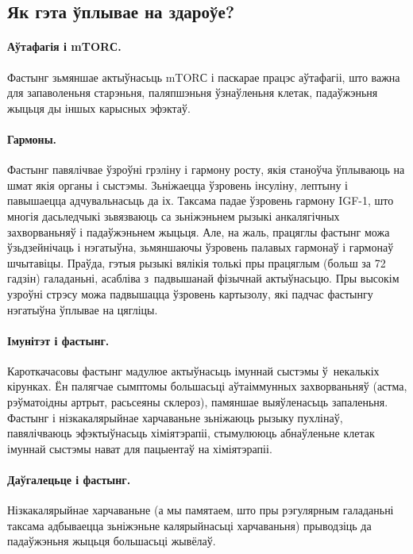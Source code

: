 \subsection{Як гэта ўплывае на здароўе?}

\paragraph{Аўтафагія і mTORС.}
Фастынг зьмяншае актыўнасьць mTORС і паскарае працэс аўтафагіі, што важна для запаволеньня старэньня, паляпшэньня ўзнаўленьня клетак, падаўжэньня жыцьця ды іншых карысных эфэктаў.

\paragraph{Гармоны.}
Фастынг павялічвае ўзроўні грэліну і гармону росту, якія станоўча ўплываюць на шмат якія органы і сыстэмы. Зьніжаецца ўзровень інсуліну, лептыну і павышаецца адчувальнасьць да іх. Таксама падае ўзровень гармону IGF-1, што многія дасьледчыкі зьвязваюць са зьніжэньнем рызыкі анкалягічных захворваньняў і падаўжэньнем жыцьця. Але, на жаль, працяглы фастынг можа ўзьдзейнічаць і нэгатыўна, зьмяншаючы ўзровень палавых гармонаў і гармонаў шчытавіцы. Праўда, гэтыя рызыкі вялікія толькі пры працяглым (больш за 72 гадзін) галаданьні, асабліва з~падвышанай фізычнай актыўнасьцю. Пры высокім узроўні стрэсу можа падвышацца ўзровень картызолу, які падчас фастынгу нэгатыўна ўплывае на цягліцы.

\paragraph{Імунітэт і фастынг.}
Кароткачасовы фастынг мадулюе актыўнасьць імуннай сыстэмы ў~некалькіх кірунках. Ён палягчае сымптомы большасьці аўтаіммунных захворваньняў (астма, рэўматоідны артрыт, расьсеяны склероз), памяншае выяўленасьць запаленьня. Фастынг і нізкакалярыйнае харчаваньне зьніжаюць рызыку пухлінаў, павялічваюць эфэктыўнасьць хіміятэрапіі, стымулююць абнаўленьне клетак імуннай сыстэмы нават для пацыентаў на хіміятэрапіі.

\paragraph{Даўгалецьце і фастынг.}
Нізкакалярыйнае харчаваньне (а мы памятаем, што пры рэгулярным галаданьні таксама адбываецца зьніжэньне калярыйнасьці харчаваньня) прыводзіць да падаўжэньня жыцьця большасьці жывёлаў.

